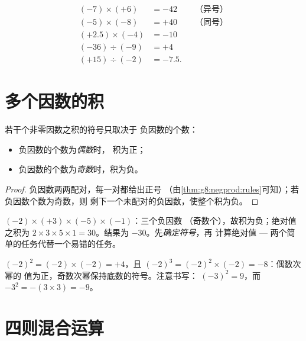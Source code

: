 \begin{example}\label{ex:g8:negprod:products}
\begin{align*}
(-7) \times (+6) &= -42 && \text{（异号）} \\
(-5) \times (-8) &= +40 && \text{（同号）} \\
(+2.5) \times (-4) &= -10 \\
(-36) \div (-9) &= +4 \\
(+15) \div (-2) &= -7.5 .
\end{align*}
\end{example}

\section{多个因数的积}

\begin{proposition}[多个因数之积的符号]\label{prop:g8:negprod:many}
若干个非零因数之积的符号只取决于
负因数的个数：
\begin{itemize}
  \item 负因数的个数为\emph{偶数}时，
        积为正；
  \item 负因数的个数为\emph{奇数}时，积为负。
\end{itemize}
\end{proposition}

\begin{proof}
负因数两两配对，每一对都给出正号
（由\cref{thm:g8:negprod:rules}可知）；若负因数个数为奇数，则
剩下一个未配对的负因数，使整个积为负。
\end{proof}

\begin{example}\label{ex:g8:negprod:many}
$(-2) \times (+3) \times (-5) \times (-1)$：三个负因数
（奇数个），故积为负；绝对值之积为 $2 \times 3 \times 5
\times 1 = 30$。结果为 $-30$。先\emph{确定符号}，再
计算绝对值 ---
两个简单的任务代替一个易错的任务。
\end{example}

\begin{example}[负数的幂]\label{ex:g8:negprod:powers}
$(-2)^2 = (-2) \times (-2) = +4$，且
$(-2)^3 = (-2)^2 \times (-2) = -8$：偶数次幂的
值为正，奇数次幂保持底数的符号。注意书写：
$(-3)^2 = 9$，而 $-3^2 = -(3 \times 3) = -9$。
\end{example}

\section{四则混合运算}

